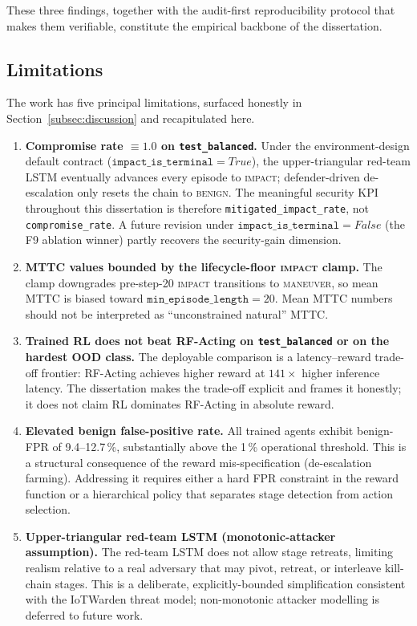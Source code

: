 These three findings, together with the audit-first reproducibility protocol that makes them verifiable, constitute the empirical backbone of the dissertation.

\subsection{Limitations}\label{subsec:limitations}
The work has five principal limitations, surfaced honestly in Section~\ref{subsec:discussion} and recapitulated here.

\begin{enumerate}
    \item \textbf{Compromise rate $\equiv 1.0$ on \texttt{test\_balanced}.} Under the environment-design default contract ($\texttt{impact\_is\_terminal}=\mathit{True}$), the upper-triangular red-team LSTM eventually advances every episode to \textsc{impact}; defender-driven de-escalation only resets the chain to \textsc{benign}. The meaningful security KPI throughout this dissertation is therefore \texttt{mitigated\_impact\_rate}, not \texttt{compromise\_rate}. A future revision under $\texttt{impact\_is\_terminal}=\mathit{False}$ (the F9 ablation winner) partly recovers the security-gain dimension.

    \item \textbf{MTTC values bounded by the lifecycle-floor \textsc{impact} clamp.} The clamp downgrades pre-step-20 \textsc{impact} transitions to \textsc{maneuver}, so mean MTTC is biased toward $\texttt{min\_episode\_length} = 20$. Mean MTTC numbers should not be interpreted as ``unconstrained natural'' MTTC.

    \item \textbf{Trained RL does not beat RF-Acting on \texttt{test\_balanced} or on the hardest OOD class.} The deployable comparison is a latency--reward trade-off frontier: RF-Acting achieves higher reward at $141\times$ higher inference latency. The dissertation makes the trade-off explicit and frames it honestly; it does not claim RL dominates RF-Acting in absolute reward.

    \item \textbf{Elevated benign false-positive rate.} All trained agents exhibit benign-FPR of 9.4--12.7\,\%, substantially above the 1\,\% operational threshold. This is a structural consequence of the reward mis-specification (de-escalation farming). Addressing it requires either a hard FPR constraint in the reward function or a hierarchical policy that separates stage detection from action selection.

    \item \textbf{Upper-triangular red-team LSTM (monotonic-attacker assumption).} The red-team LSTM does not allow stage retreats, limiting realism relative to a real adversary that may pivot, retreat, or interleave kill-chain stages. This is a deliberate, explicitly-bounded simplification consistent with the IoTWarden threat model; non-monotonic attacker modelling is deferred to future work.
\end{enumerate}

